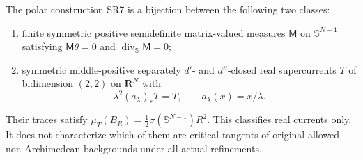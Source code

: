 \begin{theorem}
\label{thm:r13-real-angular-classification}
The polar construction SR7 is a bijection between the
following two classes:
\begin{enumerate}
\item finite symmetric positive semidefinite matrix-valued
measures $\mathsf M$ on $\mathbb S^{N-1}$ satisfying
$\mathsf M\theta=0$ and
$\operatorname{div}_{\mathbb S}\mathsf M=0$;
\item symmetric middle-positive separately $d'$- and
$d''$-closed real supercurrents $T$ of bidimension $(2,2)$
on $\mathbf R^N$ with
\[
                 \lambda^2(a_\lambda)_*T=T,
                 \qquad a_\lambda(x)=x/\lambda.
 \tag{SR20}
\]
\end{enumerate}
Their traces satisfy
$\mu_T(B_R)=\tfrac12\sigma(\mathbb S^{N-1})R^2$.
This classifies real currents only.  It does not characterize
which of them are critical tangents of original allowed
non-Archimedean backgrounds under all actual refinements.
\end{theorem}

